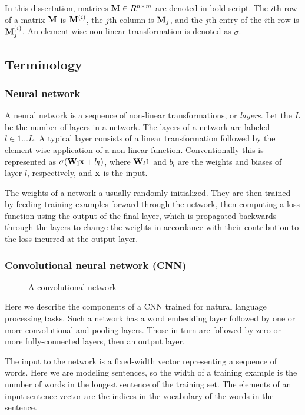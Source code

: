 In this dissertation, matrices $\mathbf{M} \in R^{n \times m}$ are denoted in bold script.  The $i$th row of a matrix $\mathbf{M}$ is $\mathbf{M}^{(i)}$, the $j$th column is $\mathbf{M}_{j}$, and the $j$th entry of the $i$th row is $\mathbf{M}_{j}^{(i)}$.  An element-wise non-linear transformation is denoted as $\sigma$.  

\subsection{Terminology}

\subsubsection{Neural network}

A neural network is a sequence of non-linear transformations, or \textit{layers}.  Let the $L$ be the number of layers in a network. The layers of a network are labeled $l \in 1 \ldots L$.  A typical layer consists of a linear transformation followed by the element-wise application of a non-linear function.  Conventionally this is represented as $\sigma(\mathbf{W_l}\mathbf{x} + b_l)$, where $\mathbf{W}_l1$ and $b_l$ are the weights and biases of layer $l$, respectively, and $\mathbf{x}$ is the input.

The weights of a network a usually randomly initialized.  They are then trained by feeding training examples forward through the network, then computing a loss function using the output of the final layer, which is propagated backwards through the layers to change the weights in accordance with their contribution to the loss incurred at the output layer.

\subsubsection{Convolutional neural network (CNN)}

\begin{figure}
    \centering
    
    \caption{A convolutional network}
    \label{fig:ConvNetVertical}
\end{figure}

Here we describe the components of a CNN trained for natural language processing tasks.  Such a network has a word embedding layer followed by one or more convolutional and pooling layers.  Those in turn are followed by zero or more fully-connected layers, then an output layer. 

The input to the network is a fixed-width vector representing a sequence of words.  Here we are modeling sentences, so the width of a training example is the number of words in the longest sentence of the training set.  The elements of an input sentence vector are the indices in the vocabulary of the words in the sentence.

